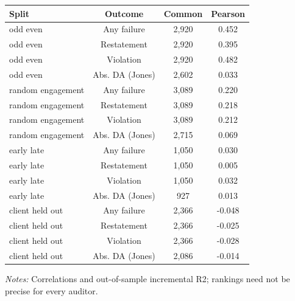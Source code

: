 \documentclass[10pt]{article}
\begin{document}
\begin{minipage}{19cm}\fontsize{10}{12}\selectfont\setlength{\tabcolsep}{4pt}\renewcommand{\arraystretch}{1.12}


\centering
{}
\begin{threeparttable}
\begin{tabular}{p{}ccc}
\toprule
Split & Outcome & Common & Pearson \\
\midrule
odd even & Any failure & 2,920 & 0.452 \\
odd even & Restatement & 2,920 & 0.395 \\
odd even & Violation & 2,920 & 0.482 \\
odd even & Abs. DA (Jones) & 2,602 & 0.033 \\
random engagement & Any failure & 3,089 & 0.220 \\
random engagement & Restatement & 3,089 & 0.218 \\
random engagement & Violation & 3,089 & 0.212 \\
random engagement & Abs. DA (Jones) & 2,715 & 0.069 \\
early late & Any failure & 1,050 & 0.030 \\
early late & Restatement & 1,050 & 0.005 \\
early late & Violation & 1,050 & 0.032 \\
early late & Abs. DA (Jones) & 927 & 0.013 \\
client held out & Any failure & 2,366 & -0.048 \\
client held out & Restatement & 2,366 & -0.025 \\
client held out & Violation & 2,366 & -0.028 \\
client held out & Abs. DA (Jones) & 2,086 & -0.014 \\
\bottomrule
\end{tabular}
\begin{tablenotes}\fontsize{9}{11}\selectfont
\item \raggedright \fontsize{9}{11}\selectfont \textit{Notes:} Correlations and out-of-sample incremental R2; rankings need not be precise for every auditor.
\end{tablenotes}
\end{threeparttable}

\end{minipage}
\end{document}
